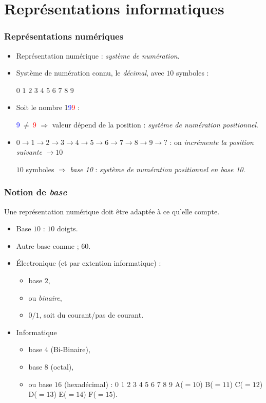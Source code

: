 \section{Repr\'esentations informatiques}

	\frame
	{
		\frametitle{Repr\'esentations num\'eriques}
		\begin{itemize}
			\item<1-> Repr\'esentation num\'erique : \emph{syst\`eme de num\'eration}.
			\item<2-> Syst\`eme de num\'eration connu, le \emph{d\'ecimal}, avec $10$ symboles :
				
			$0$ $1$ $2$ $3$ $4$ $5$ $6$ $7$ $8$ $9$
			\item<3-> Soit le nombre 1\textcolor{blue}{9}\textcolor{red}{9} :
			
			\textcolor{blue}{9}$~\neq~$\textcolor{red}{9}
			$\Rightarrow$ valeur d\'epend de la position : \emph{syst\`eme de num\'eration positionnel}.

			\item<4-> $0 \rightarrow 1\rightarrow  2 \rightarrow 3 \rightarrow 4 \rightarrow 5 \rightarrow 6 \rightarrow 7 \rightarrow 8 \rightarrow 9\rightarrow ?$ : on \emph{incr\'emente la position suivante} $\rightarrow 10$
			
			$10$ symboles $\Rightarrow$ \emph{base 10} : \emph{syst\`eme de num\'eration positionnel en base 10}.
		\end{itemize}
	}
	
	\frame
	{
		\frametitle{Notion de \emph{base}}
		
		Une repr\'esentation num\'erique doit \^etre adapt\'ee \`a ce qu'elle compte.
		\begin{itemize}
			\item<2-> Base $10$ : $10$ doigts.
			\item<3-> Autre base connue ;  $60$.
			\item<4-> \'Electronique (et par extention informatique) :
			\begin{itemize}
				\item<5-> base $2$,
				\item<6-> ou \emph{binaire},
				\item<7-> $0/1$, soit du courant/pas de courant.
			\end{itemize}
			\item<8-> Informatique
			\begin{itemize}
				\item<9-> base $4$ (Bi-Binaire),
				\item<10-> base $8$ (octal),
				\item<11-> ou base $16$ (hexad\'ecimal) : 0 1 2 3 4 5 6 7 8 9 A($=10$) B($=11$) C($=12$) D($=13$) E($=14$) F($=15$).
			\end{itemize}
		\end{itemize}
	}
	
